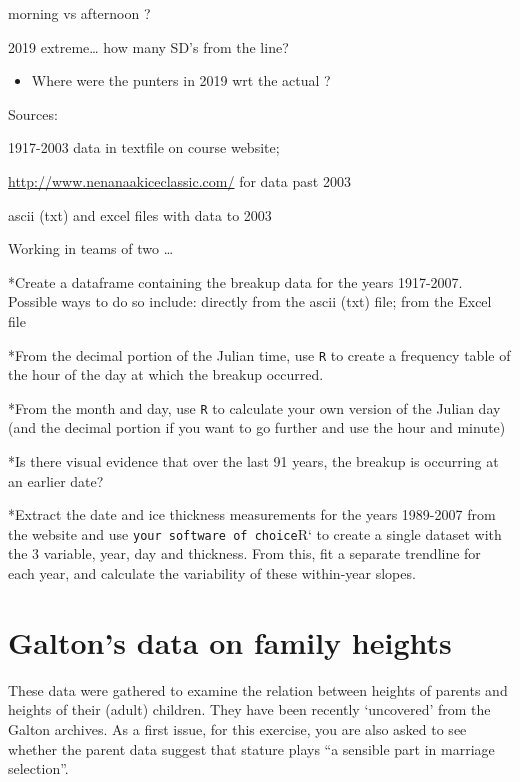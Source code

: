 \documentclass[]{book}
\providecommand{\tightlist}{%
  \setlength{\itemsep}{0pt}\setlength{\parskip}{0pt}}
\begin{document}
morning vs afternoon ?

2019 extreme\ldots{} how many SD's from the line?

\begin{itemize}
\tightlist
\item
  Where were the punters in 2019 wrt the actual ?
\end{itemize}

Sources:

1917-2003 data in textfile on course website;

\url{http://www.nenanaakiceclassic.com/} for data past 2003

ascii (txt) and excel files with data to 2003

Working in teams of two \ldots{}

*Create a dataframe containing the breakup data for the years 1917-2007. Possible ways to do so include: directly from the ascii (txt) file; from the Excel file

*From the decimal portion of the Julian time, use \texttt{R} to create a frequency table of the hour of the day at which the breakup occurred.

*From the month and day, use \texttt{R} to calculate your own version of the Julian day (and the decimal portion if you want to go further and use the hour and minute)

*Is there visual evidence that over the last 91 years, the breakup is occurring at an earlier date?

*Extract the date and ice thickness measurements for the years 1989-2007 from the website and use \texttt{your\ software\ of\ choice}R` to create a single dataset with the 3 variable, year, day and thickness. From this, fit a separate trendline for each year, and calculate the variability of these within-year slopes.

\hypertarget{galtons-data-on-family-heights}{%
\section{Galton's data on family heights}\label{galtons-data-on-family-heights}}

These data were gathered to examine the relation between heights of parents and heights of their (adult) children. They have been recently `uncovered' from the Galton archives. As a first issue, for this exercise, you are also asked to see whether the parent data suggest that stature plays ``a sensible part in marriage selection''.
\end{document}
